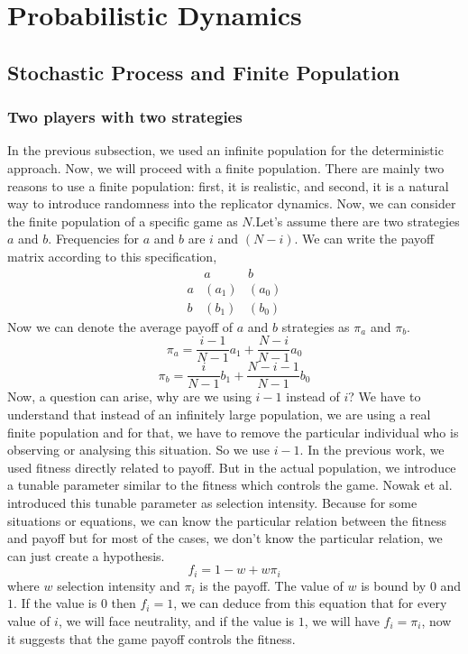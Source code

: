 \documentclass{article}
\begin{document}
\section{Probabilistic Dynamics}
\subsection{Stochastic Process and Finite Population}
\subsubsection{Two players with two strategies}
In the previous subsection, we used an infinite population for the deterministic approach\cite{Hofbauer2003}. Now, we will proceed with a finite population. There are mainly two reasons to use a finite population: first, it is realistic, and second, it is a natural way to introduce randomness into the replicator dynamics\cite{Altrock2010}.
Now, we can consider the finite population of a specific game as $N$.Let's assume there are two strategies $a$ and $b$. Frequencies for $a$ and $b$ are $i$ and $(N-i)$. We can write the payoff matrix according to this specification,
\[
\begin{array}{c|cc}
    & a & b \\
    \hline
  a & (a_1) & (a_0) \\
  b & (b_1) & (b_0)
\end{array}
\]
Now we can denote the average payoff of $a$ and $b$ strategies as $\pi_a$ and $\pi_b$.
\[\pi_a=\frac{i-1}{N-1}a_1 + \frac{N-i}{N-1}a_0\]
\[\pi_b=\frac {i}{N-1}b_1 + \frac{N-i-1}{N-1}b_0\]
Now, a question can arise, why are we using $i-1$ instead of $i$? We have to understand that instead of an infinitely large population, we are using a real finite population and for that, we have to remove the particular individual who is observing or analysing this situation. So we use $i-1$.
In the previous work, we used fitness directly related to payoff. But in the actual population, we introduce a tunable parameter similar to the fitness which controls the game.
Nowak et al.\cite{Nowak2004} introduced this tunable parameter as selection intensity. Because for some situations or equations, we can know the particular relation between the fitness and payoff but for most of the cases, we don't know the particular relation, we can just create a hypothesis.
\[f_i=1-w+w\pi_i\]
where $w$ selection intensity and $\pi_i$ is the payoff. The value of $w$ is bound by  $0$ and $1$. If the value is $0$ then $f_i=1$, we can deduce from this equation that for every value of $i$, we will face neutrality, and if the value is $1$, we will have $f_i=\pi_i$, now it suggests that the game payoff controls the fitness.
\end{document}
